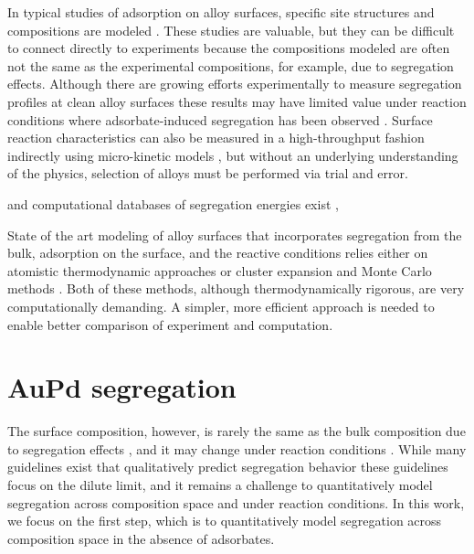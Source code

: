 \documentclass[12pt]{cmuthesis}
\begin{document}
In typical studies of adsorption on alloy surfaces, specific site structures and compositions are modeled \cite{alfonso-2003-densit-funct,greeley-2009-combin-densit}. These studies are valuable, but they can be difficult to connect directly to experiments because the compositions modeled are often not the same as the experimental compositions, for example, due to segregation effects. Although there are growing efforts experimentally to measure segregation profiles at clean alloy surfaces \cite{miller-2008-surfac-segreg,priyadarshini-2011-high-throug} these results may have limited value under reaction conditions where adsorbate-induced segregation has been observed \cite{kitchin-2008-alloy,menning-2009-gener-trend,kim-2013-co-adsor}. Surface reaction characteristics can also be measured in a high-throughput fashion indirectly using micro-kinetic models \cite{gumuslu-2015-correl-elect}, but without an underlying understanding of the physics, selection of alloys must be performed via trial and error.


and computational databases of segregation energies exist \cite{ruban-1999-surfac-segreg,han-2009-step-decor},

State of the art modeling of alloy surfaces that incorporates segregation from the bulk, adsorption on the surface, and the reactive conditions relies either on atomistic thermodynamic approaches \cite{kitchin-2008-alloy} or cluster expansion and Monte Carlo methods \cite{han-2005-surfac-segreg,mei-2009-hydrog-acety}. Both of these methods, although thermodynamically rigorous, are very computationally demanding. A simpler, more efficient approach is needed to enable better comparison of experiment and computation.

\section{AuPd segregation}
\label{sec:org702f2ce}
The surface composition, however, is rarely the same as the bulk composition due to segregation effects \cite{dowben-1990-surfac-segreg-phenom}, and it may change under reaction conditions \cite{kitchin-2008-alloy}. While many guidelines exist that qualitatively predict segregation behavior \cite{ruban-1999-calcul,skriver-2000-steps,nilekar-2009-surfac,han-2009-step-decor} these guidelines focus on the dilute limit, and it remains a challenge to quantitatively model segregation across composition space and under reaction conditions. In this work, we focus on the first step, which is to quantitatively model segregation across composition space in the absence of adsorbates.
\end{document}
